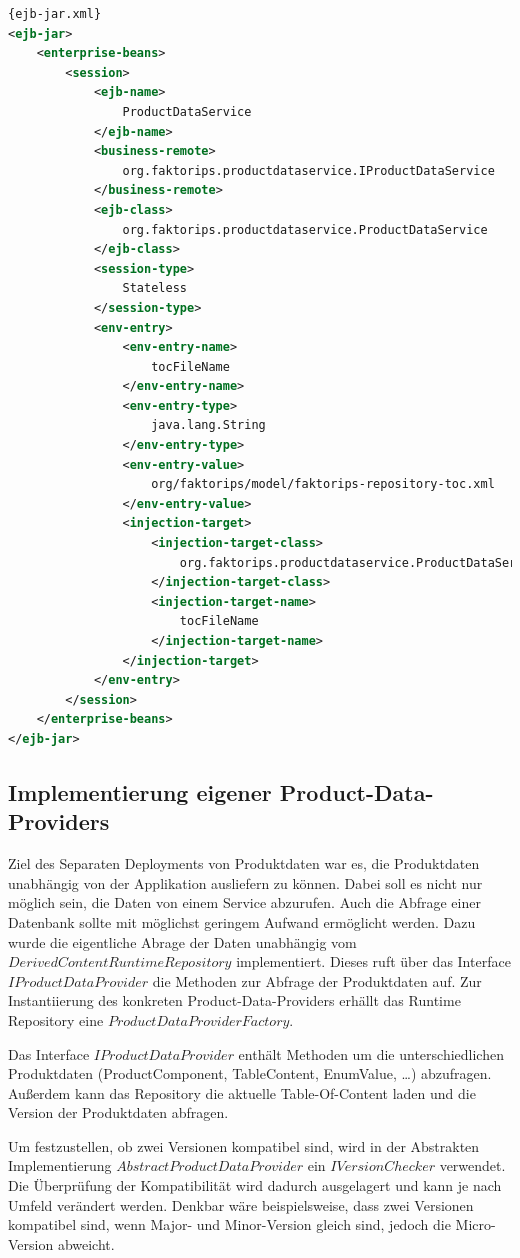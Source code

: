 \documentclass[headsepline=true, footsepline=true]{scrartcl}
\begin{document}
\begin{lstlisting}[caption=Beispiel einer ejb-jar.xml, label=ejb-jar.xml,language=XML]{ejb-jar.xml}
<ejb-jar>
	<enterprise-beans>
		<session>
			<ejb-name>
				ProductDataService
			</ejb-name>
			<business-remote>
				org.faktorips.productdataservice.IProductDataService
			</business-remote>
			<ejb-class>
				org.faktorips.productdataservice.ProductDataService
			</ejb-class>
			<session-type>
				Stateless
			</session-type>
			<env-entry>
				<env-entry-name>
					tocFileName
				</env-entry-name>
				<env-entry-type>
					java.lang.String
				</env-entry-type>
				<env-entry-value>
					org/faktorips/model/faktorips-repository-toc.xml
				</env-entry-value>
				<injection-target>
					<injection-target-class>
						org.faktorips.productdataservice.ProductDataService
					</injection-target-class>
					<injection-target-name>
						tocFileName
					</injection-target-name>
				</injection-target>
			</env-entry>
		</session>
	</enterprise-beans>
</ejb-jar>
\end{lstlisting}

\subsection{Implementierung eigener Product-Data-Providers}

Ziel des Separaten Deployments von Produktdaten war es, die Produktdaten
unabhängig von der Applikation ausliefern zu können. Dabei soll es nicht nur
möglich sein, die Daten von einem Service abzurufen. Auch die Abfrage einer
Datenbank sollte mit möglichst geringem Aufwand ermöglicht werden. Dazu wurde die
eigentliche Abrage der Daten unabhängig vom $DerivedContentRuntimeRepository$
implementiert. Dieses ruft über das Interface $IProductDataProvider$ die
Methoden zur Abfrage der Produktdaten auf. Zur Instantiierung des konkreten
Product-Data-Providers erhällt das Runtime Repository eine
$ProductDataProviderFactory$.

Das Interface $IProductDataProvider$ enthält Methoden um die unterschiedlichen
Produktdaten (ProductComponent, TableContent, EnumValue, \ldots) abzufragen.
Außerdem kann das Repository die aktuelle Table-Of-Content laden und die Version
der Produktdaten abfragen.

Um festzustellen, ob zwei Versionen kompatibel sind, wird in der Abstrakten
Implementierung $AbstractProductDataProvider$ ein $IVersionChecker$ verwendet.
Die Überprüfung der Kompatibilität wird dadurch ausgelagert und kann je nach
Umfeld verändert werden. Denkbar wäre beispielsweise, dass zwei Versionen
kompatibel sind, wenn Major- und Minor-Version gleich sind, jedoch die
Micro-Version abweicht.
\end{document}
